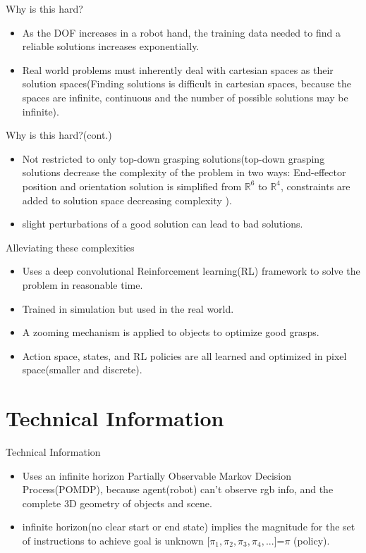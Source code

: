 \documentclass{beamer}
\begin{document}
\begin{frame}{Why is this hard?}
\begin{itemize}
\item As the DOF increases in a robot hand, the training data needed to find a reliable solutions increases exponentially. 
\item Real world problems must inherently deal with cartesian spaces as their solution spaces(Finding solutions is difficult in cartesian spaces, because the spaces are infinite, continuous and the number of possible solutions may be infinite).   
\end{itemize}
\end{frame}

\begin{frame}{Why is this hard?(cont.)}
\begin{itemize} 
\item Not restricted to only top-down grasping solutions(top-down grasping solutions decrease the complexity of the problem in two ways: End-effector position and orientation solution is simplified from $\mathbb{R}^6$ to $\mathbb{R}^4$, constraints are added to solution space decreasing complexity ).
\item slight perturbations of a good solution can lead to bad solutions.
\end{itemize}
\end{frame}

\begin{frame}{Alleviating these complexities}
\begin{itemize}
\item Uses a deep convolutional Reinforcement learning(RL) framework to solve the problem in reasonable time.
\item Trained in simulation but used in the real world.
\item A zooming mechanism is applied to objects to optimize good grasps.
\item Action space, states, and RL policies are all learned and optimized in pixel space(smaller and discrete).
\end{itemize}
\end{frame}

\section{Technical Information}
\begin{frame}{Technical Information}
\begin{itemize}
\item Uses an infinite horizon Partially Observable Markov Decision Process(POMDP), because agent(robot) can't observe rgb info, and the complete 3D geometry of objects and scene.
\item infinite horizon(no clear start or end state) implies the magnitude for the set of instructions to achieve goal is unknown [$\pi_1,\pi_2,\pi_3,\pi_4,...$]=$\pi$ (policy).  
\end{itemize}  
\end{frame}
\end{document}
